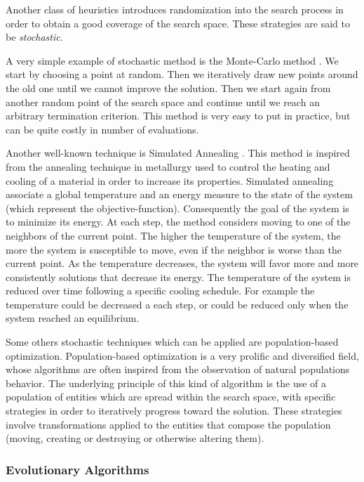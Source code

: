 Another class of heuristics introduces randomization into the search process in order to obtain a good coverage of the search space. These strategies are said to be \emph{stochastic}.

A very simple example of stochastic method is the Monte-Carlo method \cite{robert2004monte}. We start by choosing a point at random. Then we iteratively draw new points around the old one until we cannot improve the solution. Then we start again from another random point of the search space and continue until we reach an arbitrary termination criterion.
This method is very easy to put in practice, but can be quite costly in number of evaluations.

Another well-known technique is Simulated Annealing \cite{kirkpatrick1983optimization}. This method is inspired from the annealing technique in metallurgy used to control the heating and cooling of a material in order to increase its properties.
Simulated annealing associate a global temperature and an energy measure to the state of the system (which represent the objective-function). Consequently the goal of the system is to minimize its energy. At each step, the method considers moving to one of the neighbors of the current point. The higher the temperature of the system, the more the system is susceptible to move, even if the neighbor is worse than the current point. As the temperature decreases, the system will favor more and more consistently solutions that decrease its energy.
The temperature of the system is reduced over time following a specific cooling schedule. For example the temperature could be decreased a each step, or could be reduced only when the system reached an equilibrium.

Some others stochastic techniques which can be applied are population-based optimization. Population-based optimization is a very prolific and diversified field, whose algorithms are often inspired from the observation of natural populations behavior. The underlying principle of this kind of algorithm is the use of a population of entities which are spread within the search space, with specific strategies in order to iteratively progress toward the solution. These strategies involve transformations applied to the entities that compose the population (moving, creating or destroying or otherwise altering them).

\subsubsection{Evolutionary Algorithms}

